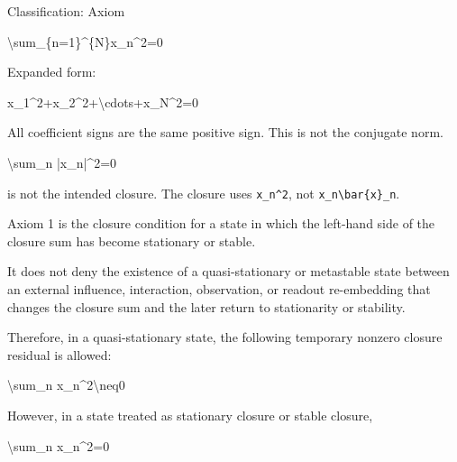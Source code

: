 \documentclass[
  a4paper,
]{article}
\newenvironment{Shaded}{}{}
\newcommand{\NormalTok}[1]{#1}
\begin{document}
Classification: Axiom

\begin{Shaded}
\begin{Highlighting}[]
\NormalTok{\textbackslash{}sum\_\{n=1\}\^{}\{N\}x\_n\^{}2=0}
\end{Highlighting}
\end{Shaded}

Expanded form:

\begin{Shaded}
\begin{Highlighting}[]
\NormalTok{x\_1\^{}2+x\_2\^{}2+\textbackslash{}cdots+x\_N\^{}2=0}
\end{Highlighting}
\end{Shaded}

All coefficient signs are the same positive sign. This is not the
conjugate norm.

\begin{Shaded}
\begin{Highlighting}[]
\NormalTok{\textbackslash{}sum\_n |x\_n|\^{}2=0}
\end{Highlighting}
\end{Shaded}

is not the intended closure. The closure uses \texttt{x\_n\^{}2}, not
\texttt{x\_n\textbackslash{}bar\{x\}\_n}.

Axiom 1 is the closure condition for a state in which the left-hand side
of the closure sum has become stationary or stable.

It does not deny the existence of a quasi-stationary or metastable state
between an external influence, interaction, observation, or readout
re-embedding that changes the closure sum and the later return to
stationarity or stability.

Therefore, in a quasi-stationary state, the following temporary nonzero
closure residual is allowed:

\begin{Shaded}
\begin{Highlighting}[]
\NormalTok{\textbackslash{}sum\_n x\_n\^{}2\textbackslash{}neq0}
\end{Highlighting}
\end{Shaded}

However, in a state treated as stationary closure or stable closure,

\begin{Shaded}
\begin{Highlighting}[]
\NormalTok{\textbackslash{}sum\_n x\_n\^{}2=0}
\end{Highlighting}
\end{Shaded}
\end{document}
